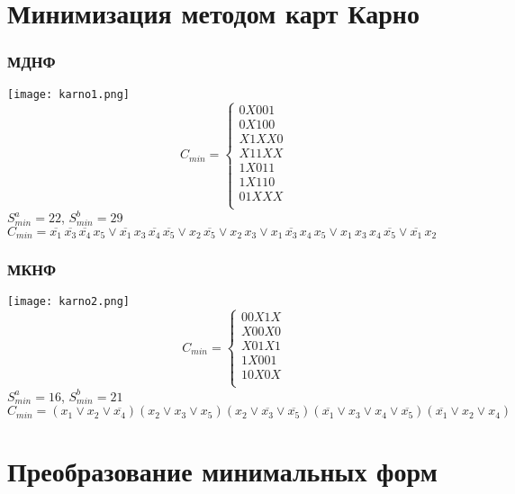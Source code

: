 \documentclass[12pt,a4paper]{report}
\begin{document}
\section*{Минимизация методом карт Карно}
\subsubsection*{МДНФ}
\texttt{[image: karno1.png]}
\begin{equation*}
    C_{min}=
    \begin{cases}
        0X001\\
        0X100\\
        X1XX0\\
        X11XX\\
        1X011\\
        1X110\\
        01XXX\\
    \end{cases}
\end{equation*}
$S_{min}^a=22$, $S_{min}^b=29$\\
\hfill\break
$C_{min}=\overline{x_1}\,\overline{x_3}\,\overline{x_4}\,x_5\vee\overline{x_1}\,x_3\,\overline{x_4}\,\overline{x_5}\vee x_2\,\overline{x_5}\vee x_2\,x_3\vee x_1\,\overline{x_3}\,x_4\,x_5\vee x_1\,x_3\,x_4\,\overline{x_5}\vee \overline{x_1}\,x_2$\\
\pagebreak
\subsubsection*{МКНФ}
\texttt{[image: karno2.png]}
\begin{equation*}
    C_{min}=
    \begin{cases}
        00X1X\\
        X00X0\\
        X01X1\\
        1X001\\
        10X0X\\
    \end{cases}
\end{equation*}
$S_{min}^a=16$, $S_{min}^b=21$\\
\hfill\break
$C_{min}=(x_1\vee x_2\vee \overline{x_4})(x_2\vee x_3\vee x_5)(x_2\vee\overline{x_3}\vee\overline{x_5})(\overline{x_1}\vee x_3\vee x_4\vee \overline{x_5})(\overline{x_1}\vee x_2\vee x_4)$
\section*{Преобразование минимальных форм}
\end{document}
